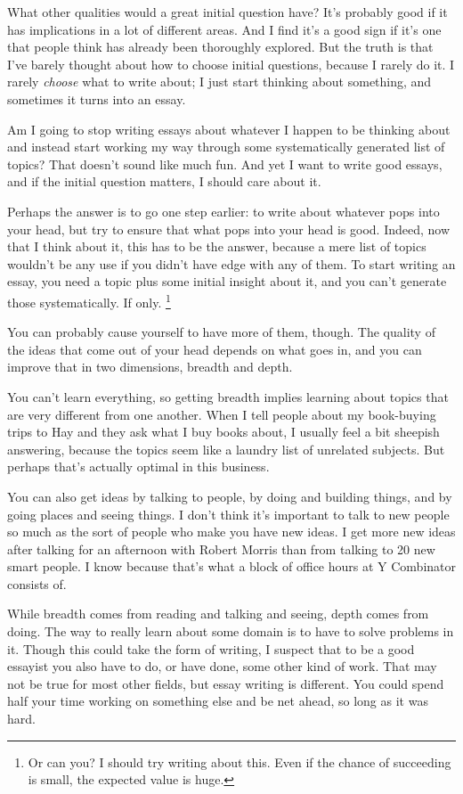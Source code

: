 \documentclass[12pt]{book}
\begin{document}
What other qualities would a great initial question have? It's probably
good if it has implications in a lot of different areas. And I find it's
a good sign if it's one that people think has already been thoroughly
explored. But the truth is that I've barely thought about how to choose
initial questions, because I rarely do it. I rarely \emph{choose} what
to write about; I just start thinking about something, and sometimes it
turns into an essay.

Am I going to stop writing essays about whatever I happen to be thinking
about and instead start working my way through some systematically
generated list of topics? That doesn't sound like much fun. And yet I
want to write good essays, and if the initial question matters, I should
care about it.

Perhaps the answer is to go one step earlier: to write about whatever
pops into your head, but try to ensure that what pops into your head is
good. Indeed, now that I think about it, this has to be the answer,
because a mere list of topics wouldn't be any use if you didn't have
edge with any of them. To start writing an essay, you need a topic plus
some initial insight about it, and you can't generate those
systematically. If only. \footnote{Or can you? I should try writing about this. Even if the chance
of succeeding is small, the expected value is huge.}

You can probably cause yourself to have more of them, though. The
quality of the ideas that come out of your head depends on what goes in,
and you can improve that in two dimensions, breadth and depth.

You can't learn everything, so getting breadth implies learning about
topics that are very different from one another. When I tell people
about my book-buying trips to Hay and they ask what I buy books about, I
usually feel a bit sheepish answering, because the topics seem like a
laundry list of unrelated subjects. But perhaps that's actually optimal
in this business.

You can also get ideas by talking to people, by doing and building
things, and by going places and seeing things. I don't think it's
important to talk to new people so much as the sort of people who make
you have new ideas. I get more new ideas after talking for an afternoon
with Robert Morris than from talking to 20 new smart people. I know
because that's what a block of office hours at Y Combinator consists of.

While breadth comes from reading and talking and seeing, depth comes
from doing. The way to really learn about some domain is to have to
solve problems in it. Though this could take the form of writing, I
suspect that to be a good essayist you also have to do, or have done,
some other kind of work. That may not be true for most other fields, but
essay writing is different. You could spend half your time working on
something else and be net ahead, so long as it was hard.
\end{document}
